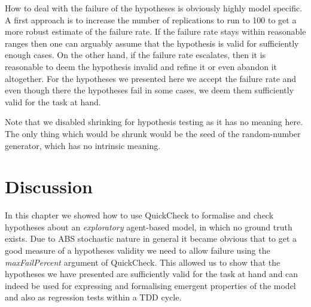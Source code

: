 
How to deal with the failure of the hypotheses is obviously highly model specific. A first approach is to increase the number of replications to run to 100 to get a more robust estimate of the failure rate. If the failure rate stays within reasonable ranges then one can arguably assume that the hypothesis is valid for sufficiently enough cases. On the other hand, if the failure rate escalates, then it is reasonable to deem the hypothesis invalid and refine it or even abandon it altogether. For the hypotheses we presented here we accept the failure rate and even though there the hypotheses fail in some cases, we deem them sufficiently valid for the task at hand.

Note that we disabled shrinking for hypothesis testing as it has no meaning here. The only thing which would be shrunk would be the seed of the random-number generator, which has no intrinsic meaning.

\section{Discussion}
In this chapter we showed how to use QuickCheck to formalise and check hypotheses about an \textit{exploratory} agent-based model, in which no ground truth exists. Due to ABS stochastic nature in general it became obvious that to get a good measure of a hypotheses validity we need to allow failure using the \textit{maxFailPercent} argument of QuickCheck. This allowed us to show that the hypotheses we have presented are sufficiently valid for the task at hand and can indeed be used for expressing and formalising emergent properties of the model and also as regression tests within a TDD cycle.